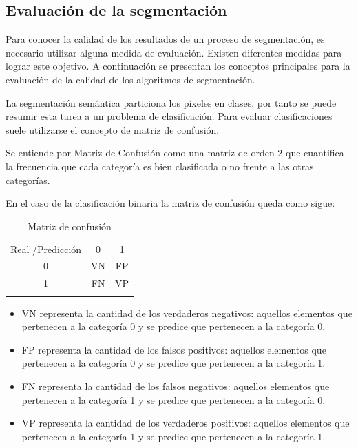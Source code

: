 \subsection{Evaluación de la segmentación}\label{sec:evalSeg}

Para conocer la calidad de los resultados de un proceso de segmentación, es necesario utilizar alguna medida de evaluación. Existen diferentes medidas para lograr este objetivo. A continuación se presentan los conceptos principales para la evaluación de la calidad de los algoritmos de segmentación.

La segmentación semántica particiona los píxeles en clases, por tanto se puede resumir esta tarea a un problema de clasificación. Para evaluar clasificaciones suele utilizarse el concepto de matriz de confusión.

\begin{definition}
	Se entiende por Matriz de Confusión como una matriz de orden $2$ que cuantifica la frecuencia que cada categoría es bien clasificada o no frente a las otras categorías.
\end{definition}

En el caso de la clasificación binaria la matriz de confusión queda como sigue:

\begin{table}[ht]
	\centering
	\begin{tabular}{|| c || c | c ||}
		\hhline{|=||=|=|}
		
		Real /Predicción & 0 & 1\\ \hhline{||=||=|=||}
		0 & VN & FP\\
		1 & FN & VP \\ \hhline{|=||=|=|}
	\end{tabular}
	\caption{Matriz de confusión}
	\label{tab:conf}
\end{table}

\begin{itemize}
	\item VN representa la cantidad  de los verdaderos negativos: aquellos elementos que pertenecen a la categoría 0 y se predice que pertenecen a la categoría 0.
	\item FP representa la cantidad  de  los falsos positivos: aquellos elementos que pertenecen a la categoría 0 y se predice que pertenecen a la categoría 1.
	\item FN representa la cantidad  de  los falsos negativos: aquellos elementos que pertenecen a la categoría 1 y se predice que pertenecen a la categoría 0.
	\item VP representa la cantidad  de  los verdaderos positivos: aquellos elementos que pertenecen a la categoría 1 y se predice que pertenecen a la categoría 1.
\end{itemize}

